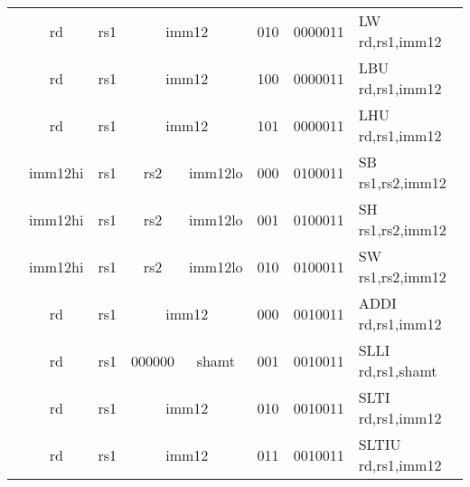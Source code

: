 \begin{table}[p]
\begin{small}
\begin{center}
\begin{tabular}{rccccccccccl}
&
\multicolumn{1}{|c|}{rd} &
\multicolumn{1}{c|}{rs1} &
\multicolumn{5}{c|}{imm12} &
\multicolumn{2}{c|}{010} &
\multicolumn{1}{c|}{0000011} & LW rd,rs1,imm12 \\
\cline{2-11}
  

&
\multicolumn{1}{|c|}{rd} &
\multicolumn{1}{c|}{rs1} &
\multicolumn{5}{c|}{imm12} &
\multicolumn{2}{c|}{100} &
\multicolumn{1}{c|}{0000011} & LBU rd,rs1,imm12 \\
\cline{2-11}
  

&
\multicolumn{1}{|c|}{rd} &
\multicolumn{1}{c|}{rs1} &
\multicolumn{5}{c|}{imm12} &
\multicolumn{2}{c|}{101} &
\multicolumn{1}{c|}{0000011} & LHU rd,rs1,imm12 \\
\cline{2-11}
  

&
\multicolumn{1}{|c|}{imm12hi} &
\multicolumn{1}{c|}{rs1} &
\multicolumn{1}{c|}{rs2} &
\multicolumn{4}{c|}{imm12lo} &
\multicolumn{2}{c|}{000} &
\multicolumn{1}{c|}{0100011} & SB rs1,rs2,imm12 \\
\cline{2-11}
  

&
\multicolumn{1}{|c|}{imm12hi} &
\multicolumn{1}{c|}{rs1} &
\multicolumn{1}{c|}{rs2} &
\multicolumn{4}{c|}{imm12lo} &
\multicolumn{2}{c|}{001} &
\multicolumn{1}{c|}{0100011} & SH rs1,rs2,imm12 \\
\cline{2-11}
  

&
\multicolumn{1}{|c|}{imm12hi} &
\multicolumn{1}{c|}{rs1} &
\multicolumn{1}{c|}{rs2} &
\multicolumn{4}{c|}{imm12lo} &
\multicolumn{2}{c|}{010} &
\multicolumn{1}{c|}{0100011} & SW rs1,rs2,imm12 \\
\cline{2-11}
  

&
\multicolumn{1}{|c|}{rd} &
\multicolumn{1}{c|}{rs1} &
\multicolumn{5}{c|}{imm12} &
\multicolumn{2}{c|}{000} &
\multicolumn{1}{c|}{0010011} & ADDI rd,rs1,imm12 \\
\cline{2-11}
  

&
\multicolumn{1}{|c|}{rd} &
\multicolumn{1}{c|}{rs1} &
\multicolumn{2}{c|}{000000} &
\multicolumn{3}{c|}{shamt} &
\multicolumn{2}{c|}{001} &
\multicolumn{1}{c|}{0010011} & SLLI rd,rs1,shamt \\
\cline{2-11}
  

&
\multicolumn{1}{|c|}{rd} &
\multicolumn{1}{c|}{rs1} &
\multicolumn{5}{c|}{imm12} &
\multicolumn{2}{c|}{010} &
\multicolumn{1}{c|}{0010011} & SLTI rd,rs1,imm12 \\
\cline{2-11}
  

&
\multicolumn{1}{|c|}{rd} &
\multicolumn{1}{c|}{rs1} &
\multicolumn{5}{c|}{imm12} &
\multicolumn{2}{c|}{011} &
\multicolumn{1}{c|}{0010011} & SLTIU rd,rs1,imm12 \\
\cline{2-11}
  


\end{tabular}
\end{center}
\end{small}
\end{table}
